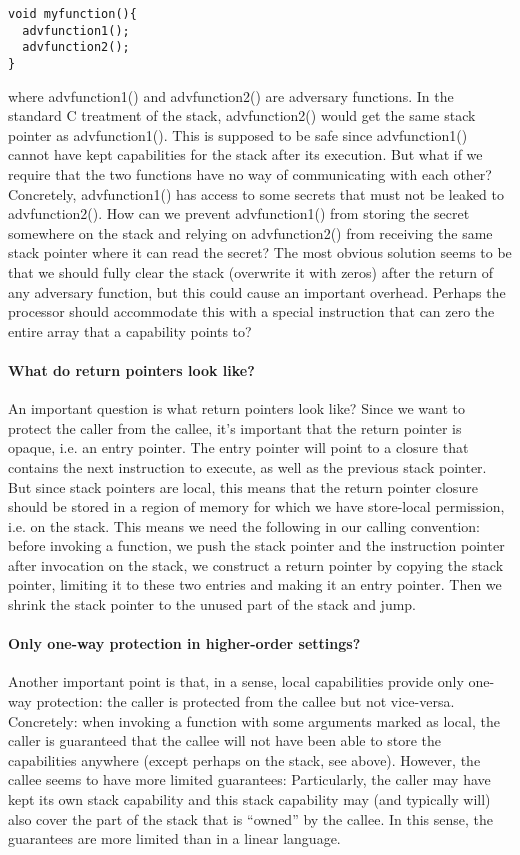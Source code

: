 \documentclass{article}
\begin{document}
\begin{verbatim}
void myfunction(){
  advfunction1();
  advfunction2();
}
\end{verbatim}

where advfunction1() and advfunction2() are adversary functions. In the standard
C treatment of the stack, advfunction2() would get the same stack pointer as
advfunction1(). This is supposed to be safe since advfunction1() cannot have
kept capabilities for the stack after its execution. But what if we require that
the two functions have no way of communicating with each other? Concretely,
advfunction1() has access to some secrets that must not be leaked to
advfunction2(). How can we prevent advfunction1() from storing the secret
somewhere on the stack and relying on advfunction2() from receiving the same
stack pointer where it can read the secret? The most obvious solution seems to
be that we should fully clear the stack (overwrite it with zeros) after the
return of any adversary function, but this could cause an important overhead.
Perhaps the processor should accommodate this with a special instruction that can
zero the entire array that a capability points to?

\paragraph{What do return pointers look like?}
An important question is what return pointers look like? Since we want to
protect the caller from the callee, it's important that the return pointer is
opaque, i.e. an entry pointer. The entry pointer will point to a closure that
contains the next instruction to execute, as well as the previous stack pointer.
But since stack pointers are local, this means that the return pointer closure
should be stored in a region of memory for which we have store-local permission,
i.e. on the stack. This means we need the following in our calling convention:
before invoking a function, we push the stack pointer and the instruction
pointer after invocation on the stack, we construct a return pointer by
copying the stack pointer, limiting it to these two entries and making it an
entry pointer.  Then we shrink the stack pointer to the unused part of the stack
and jump. 

\paragraph{Only one-way protection in higher-order settings?}
Another important point is that, in a sense, local capabilities provide only
one-way protection: the caller is protected from the callee but not vice-versa.
Concretely: when invoking a function with some arguments marked as local, the
caller is guaranteed that the callee will not have been able to store the
capabilities anywhere (except perhaps on the stack, see above). However, the
callee seems to have more limited guarantees: Particularly, the caller may have
kept its own stack capability and this stack capability may (and typically will)
also cover the part of the stack that is ``owned'' by the callee.  In this
sense, the guarantees are more limited than in a linear language.
\end{document}

